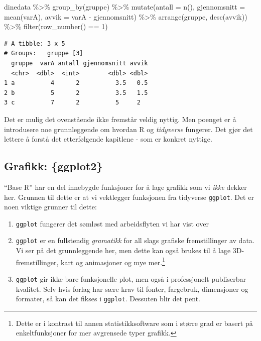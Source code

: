 \documentclass[
  letterpaper,
  DIV=11,
  numbers=noendperiod]{scrreprt}
\newenvironment{Shaded}{\begin{snugshade}}{\end{snugshade}}
\newcommand{\AttributeTok}[1]{\textcolor[rgb]{0.40,0.45,0.13}{#1}}
\newcommand{\DecValTok}[1]{\textcolor[rgb]{0.68,0.00,0.00}{#1}}
\newcommand{\FunctionTok}[1]{\textcolor[rgb]{0.28,0.35,0.67}{#1}}
\newcommand{\NormalTok}[1]{\textcolor[rgb]{0.00,0.23,0.31}{#1}}
\newcommand{\SpecialCharTok}[1]{\textcolor[rgb]{0.37,0.37,0.37}{#1}}
\providecommand{\tightlist}{%
  \setlength{\itemsep}{0pt}\setlength{\parskip}{0pt}}\usepackage{longtable,booktabs,array}
\theoremstyle{definition}
\theoremstyle{remark}
\begin{document}
\begin{Shaded}
\begin{Highlighting}[]
\NormalTok{dinedata }\SpecialCharTok{\%\textgreater{}\%} 
  \FunctionTok{group\_by}\NormalTok{(gruppe) }\SpecialCharTok{\%\textgreater{}\%} 
  \FunctionTok{mutate}\NormalTok{(}\AttributeTok{antall =} \FunctionTok{n}\NormalTok{(), }\AttributeTok{gjennomsnitt =} \FunctionTok{mean}\NormalTok{(varA), }
         \AttributeTok{avvik =}\NormalTok{ varA }\SpecialCharTok{{-}}\NormalTok{ gjennomsnitt) }\SpecialCharTok{\%\textgreater{}\%} 
  \FunctionTok{arrange}\NormalTok{(gruppe, }\FunctionTok{desc}\NormalTok{(avvik)) }\SpecialCharTok{\%\textgreater{}\%} 
  \FunctionTok{filter}\NormalTok{(}\FunctionTok{row\_number}\NormalTok{() }\SpecialCharTok{==} \DecValTok{1}\NormalTok{)}
\end{Highlighting}
\end{Shaded}

\begin{verbatim}
# A tibble: 3 x 5
# Groups:   gruppe [3]
  gruppe  varA antall gjennomsnitt avvik
  <chr>  <dbl>  <int>        <dbl> <dbl>
1 a          4      2          3.5   0.5
2 b          5      2          3.5   1.5
3 c          7      2          5     2  
\end{verbatim}

Det er mulig det ovenstående ikke fremstår veldig nyttig. Men poenget er
å introdusere noe grunnleggende om hvordan R og \emph{tidyverse}
fungerer. Det gjør det lettere å forstå det etterfølgende kapitlene -
som er konkret nyttige.

\hypertarget{grafikk-ggplot2}{%
\subsection{Grafikk: \{ggplot2\}}\label{grafikk-ggplot2}}

``Base R'' har en del innebygde funksjoner for å lage grafikk som vi
\emph{ikke} dekker her. Grunnen til dette er at vi vektlegger funksjonen
fra tidyverse \texttt{ggplot}. Det er noen viktige grunner til dette:

\begin{enumerate}
\def\labelenumi{\arabic{enumi})}
\tightlist
\item
  \texttt{ggplot} fungerer det sømløst med arbeidsflyten vi har vist
  over
\item
  \texttt{ggplot} er en fullstendig \emph{gramatikk} for all slags
  grafiske fremstillinger av data. Vi ser på det grunnleggende her, men
  dette kan også brukes til å lage 3D-fremstillinger, kart og
  animasjoner og mye mer.\footnote{Dette er i kontrast til annen
    statistikksoftware som i større grad er basert på enkeltfunksjoner
    for mer avgrensede typer grafikk.}
\item
  \texttt{ggplot} gir ikke bare funksjonelle plot, men også i
  professjonelt publiserbar kvalitet. Selv hvis forlag har sære krav til
  fonter, fargebruk, dimensjoner og formater, så kan det fikses i
  \texttt{ggplot}. Dessuten blir det pent.
\end{enumerate}
\end{document}
